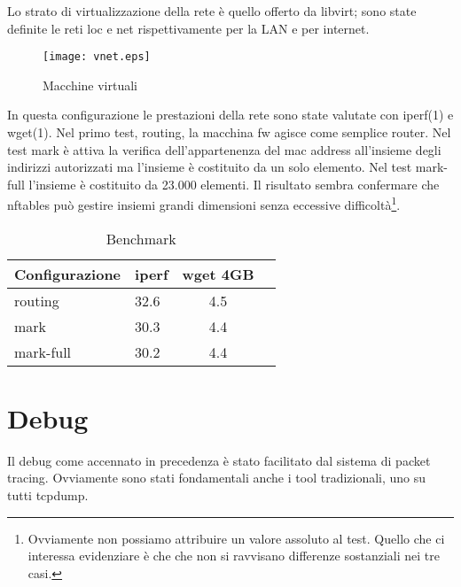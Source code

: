 Lo strato di virtualizzazione della rete \`e quello offerto da libvirt; sono
state definite le reti loc e net rispettivamente per la LAN e per internet.
\begin{figure}[H]
\begin{center}
      \texttt{[image: vnet.eps]}
      \caption{Macchine virtuali}
      \label{fig:vnet}
\end{center}
\end{figure}
\noindent In questa configurazione le prestazioni della rete sono state valutate con
iperf(1) e wget(1).
Nel primo test, routing, la macchina fw agisce come semplice router.
Nel test mark \`e attiva la verifica dell'appartenenza del mac address
all'insieme degli indirizzi autorizzati ma l'insieme \`e costituito da un solo
elemento.
Nel test mark-full l'insieme \`e costituito da 23.000 elementi.
Il risultato sembra confermare che nftables pu\`o gestire
insiemi grandi dimensioni senza eccessive difficolt\`a\footnote{Ovviamente non
possiamo attribuire un valore assoluto al test. Quello che ci interessa
evidenziare \`e che che non si ravvisano differenze sostanziali nei tre casi.}.

\begin{center}
  \label{tab:benchmark}
  \begin{table}[ht]
    \centering %
     \begin{tabular}{@{}llcc@{}}
     \toprule
     {\bf Configurazione} & {\bf iperf} & {\bf wget 4GB} \\ \midrule
         routing  & 32.6                & 4.5 \\
         mark     & 30.3                & 4.4 \\ 
         mark-full& 30.2                & 4.4 \\ \bottomrule
      \end{tabular}  
    \caption{Benchmark} %
  \end{table}
\end{center}


\section{Debug}

Il debug come accennato in precedenza \`e stato facilitato dal sistema di
packet tracing.
Ovviamente sono stati fondamentali anche i tool tradizionali, uno su tutti tcpdump.

